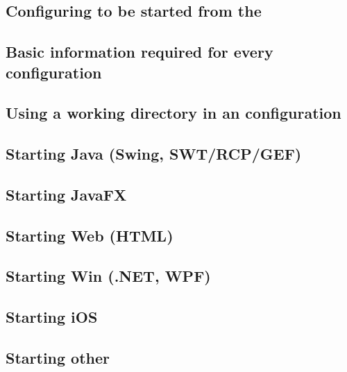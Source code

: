 \subsection{Configuring \gdauts{} to be started from the \ite{}}
\label{configuringaut}


\subsection{Basic information required for every \gdaut{} configuration}
\label{TasksBasicConfigurationInfo}


\subsection{Using a working directory in an \gdaut{} configuration}
\label{TasksWorkingDir}


\subsection{Starting Java \gdauts{} (Swing, SWT/RCP/GEF)}
\label{TasksStartJavaAUT}


\subsection{Starting JavaFX \gdauts{}}
\label{TasksStartFXAUT}


\subsection{Starting Web \gdauts{} (HTML)}
\label{TasksStartWebAUT}


\subsection{Starting Win \gdauts{} (.NET, WPF)}
\label{TasksStartWinAUT}
 

\subsection{Starting iOS \gdauts{}}
\label{TasksStartiOSAUT}


\subsection{Starting other \gdauts{}}




